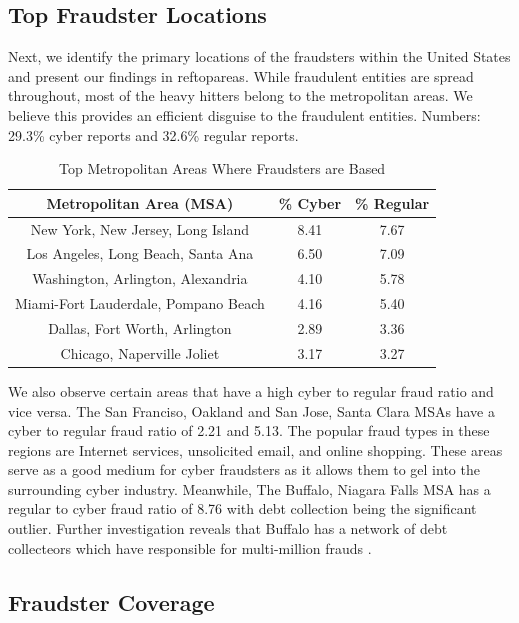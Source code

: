 \documentclass[conference]{IEEEtran}
\begin{document}
\subsection{Top Fraudster Locations}\label{fraudsters}
Next, we identify the primary locations of the fraudsters within the United States and present our findings in ref{topareas}. While fraudulent entities are spread throughout, most of the heavy hitters belong to the metropolitan areas. We believe this provides an efficient disguise to the fraudulent entities.  
Numbers: 29.3\% cyber reports and 32.6\% regular reports.


\begin{table}[h]
\centering
\begin{tabular}{c|c|c}
\hline
\bfseries Metropolitan Area (MSA) & \bfseries \% Cyber & \bfseries \% Regular\\
\hline
\hline
New York, New Jersey, Long Island & 8.41 & 7.67 \\
\hline
Los Angeles, Long Beach, Santa Ana & 6.50 & 7.09 \\
\hline
Washington, Arlington, Alexandria & 4.10 & 5.78 \\
\hline
Miami-Fort Lauderdale, Pompano Beach & 4.16 & 5.40 \\
\hline
Dallas, Fort Worth, Arlington & 2.89 & 3.36\\
\hline
Chicago, Naperville Joliet & 3.17 & 3.27 \\
\hline
\end{tabular}
\vspace{8pt}
\caption{Top Metropolitan Areas Where Fraudsters are Based}\label{topareas}
\vspace{-15pt}
\end{table}

We also observe certain areas that have a high cyber to regular fraud ratio and vice versa. The San Franciso, Oakland and San Jose, Santa Clara MSAs have a cyber to regular fraud ratio of 2.21 and 5.13. The popular fraud types in these regions are Internet services, unsolicited email, and online shopping. These areas serve as a good medium for cyber fraudsters as it allows them to gel into the surrounding cyber industry. Meanwhile, The Buffalo, Niagara Falls MSA has a regular to cyber fraud ratio of 8.76 with debt collection being the significant outlier. Further investigation reveals that Buffalo has a network of debt collecteors which have responsible for multi-million frauds \cite{buffalodebt1, buffalodebt2}.


\subsection{Fraudster Coverage}\label{fraudstercoverage}
\end{document}

